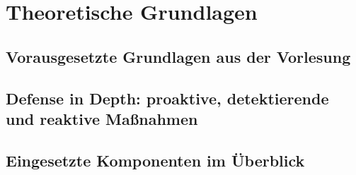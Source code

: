 \chapter{Theoretische Grundlagen}\label{chap:theoretische-grundlagen}


\section{Vorausgesetzte Grundlagen aus der Vorlesung}\label{sec:vorausgesetzte-grundlagen-aus-der-vorlesung}


\section{Defense in Depth: proaktive, detektierende und reaktive Maßnahmen}\label{sec:defense-in-depth-proaktive-detektierende-und-reaktive-massnahmen}


\section{Eingesetzte Komponenten im Überblick}\label{sec:eingesetzte-komponenten-im-ueberblick}

